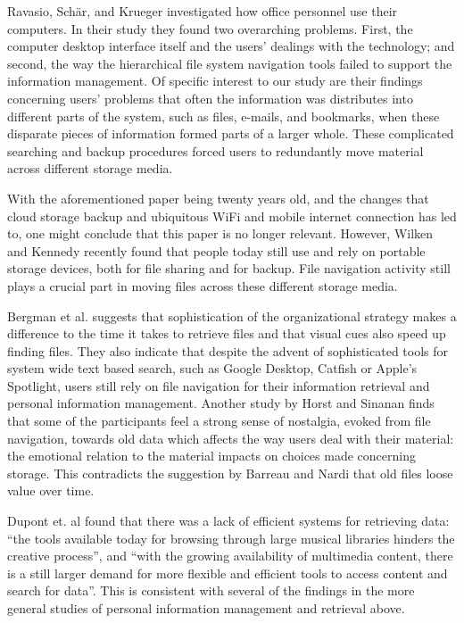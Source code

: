 \documentclass[runningheads,a4paper]{cmmr2023}
\begin{document}
Ravasio, Sch\"ar, and Krueger \cite{Ravasio2004} investigated how office personnel use their computers. In their study they found two overarching problems. First, the computer desktop interface itself and the users' dealings with the technology; and second, the way the hierarchical file system navigation tools failed to support the information management. Of specific interest to our study are their findings concerning users' problems that often the information was distributes into different parts of the system, such as files, e-mails, and bookmarks, when these disparate pieces of information formed parts of a larger whole. These complicated searching and backup procedures forced users to redundantly move material across different storage media. 

With the aforementioned paper being twenty years old, and the changes that cloud storage backup and ubiquitous WiFi and mobile internet connection has led to, one might conclude that this paper is no longer relevant. However, Wilken and Kennedy \cite{Wilken2021} recently found that people today still use and rely on portable storage devices, both for file sharing and for backup. File navigation activity still plays a crucial part in moving files across these different storage media.

Bergman et al. \cite{Bergman2012} suggests that sophistication of the organizational strategy makes a difference to the time it takes to retrieve files and that visual cues also speed up finding files. They also indicate that despite the advent of sophisticated tools for system wide text based search, such as Google Desktop, Catfish or Apple’s Spotlight, users still rely on file navigation for their information retrieval and personal information management. Another study by Horst and Sinanan \cite{horst2021} finds that some of the participants feel a strong sense of nostalgia, evoked from file navigation, towards old data which affects the way users deal with their material: the emotional relation to the material impacts on choices made concerning storage. This contradicts the suggestion by Barreau and Nardi \cite{Barreau1995} that old files loose value over time. 

Dupont et. al \cite{dupont2009} found that there was a lack of efficient systems for retrieving data: “the tools available today for browsing through large musical libraries hinders the creative process”, and “with the growing availability of multimedia content, there is a still larger demand for more flexible and efficient tools to access content and search for data”. This is consistent with several of the findings in the more general studies of personal information management and retrieval above. 
\end{document}
